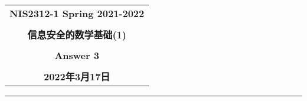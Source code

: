 \documentclass[a4paper,12pt]{ctexart}
\begin{document}
  \begin{center}

  \vspace{-0.3in}
  \begin{tabular}{c}
    \textbf{\Large NIS2312-1 Spring 2021-2022} \\
    \textbf{\Large  } \\
    \textbf{\Large  信息安全的数学基础(1)} \\
    \textbf{\Large  } \\
    \textbf{\Large  Answer 3 } \\
    \textbf{\Large  } \\
    \textbf{\Large 2022年3月17日} \\
  \end{tabular}
  \end{center}
  \noindent
  \rule{\linewidth}{0.4pt}
\end{document}
